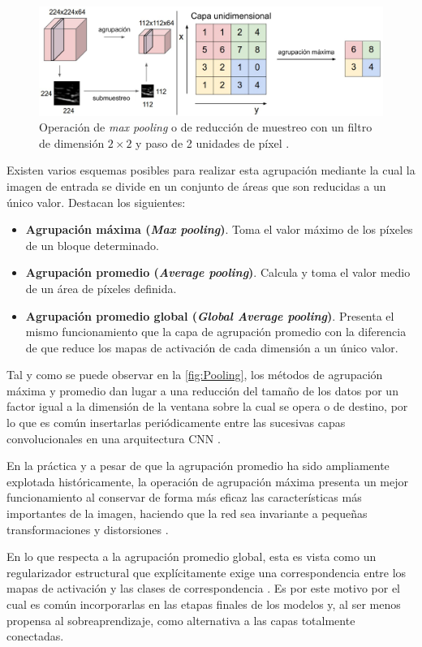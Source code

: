 \begin{figure}
    \centering
    \includegraphics[width=\textwidth]{Images/Pooling.png}
    \caption{Operación de \textit{max pooling} o de reducción de muestreo con un filtro de dimensión $2\times 2$ y paso de 2 unidades de píxel \cite{CS231n}.}
    \label{fig:Pooling}
\end{figure}

Existen varios esquemas posibles para realizar esta agrupación mediante la cual la imagen de entrada se divide en un conjunto de áreas que son reducidas a un único valor. Destacan los siguientes:
\begin{itemize}
  \item \textbf{Agrupación máxima (\textit{Max pooling})}. Toma el valor máximo de los píxeles de un bloque determinado.
  \item \textbf{Agrupación promedio (\textit{Average pooling})}. Calcula y toma el valor medio de un área de píxeles definida.
  \item \textbf{Agrupación promedio global (\textit{Global Average pooling})}. Presenta el mismo funcionamiento que la capa de agrupación promedio con la diferencia de que reduce los mapas de activación de cada dimensión a un único valor. 
\end{itemize}

Tal y como se puede observar en la \autoref{fig:Pooling}, los métodos de agrupación máxima y promedio dan lugar a una reducción del tamaño de los datos por un factor igual a la dimensión de la ventana sobre la cual se opera o de destino, por lo que es común insertarlas periódicamente entre las sucesivas capas convolucionales en una arquitectura CNN \cite{CS231n}.

En la práctica y a pesar de que la agrupación promedio ha sido ampliamente explotada históricamente, la operación de agrupación máxima presenta un mejor funcionamiento al conservar de forma más eficaz las características más importantes de la imagen, haciendo que la red sea invariante a pequeñas transformaciones y distorsiones \cite{Pooling}.

En lo que respecta a la agrupación promedio global, esta es vista como un regularizador estructural que explícitamente exige una correspondencia entre los mapas de activación y las clases de correspondencia \cite{NetworkInNetwork}. Es por este motivo por el cual es común incorporarlas en las etapas finales de los modelos y, al ser menos propensa al sobreaprendizaje, como alternativa a las capas totalmente conectadas.

